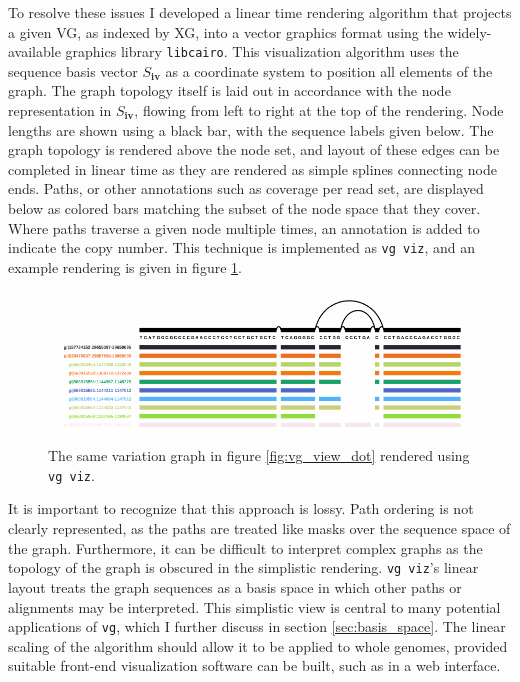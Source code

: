 To resolve these issues I developed a linear time rendering algorithm that projects a given VG, as indexed by XG, into a vector graphics format using the widely-available graphics library {\tt libcairo}.
This visualization algorithm uses the sequence basis vector $S_\textbf{iv}$ as a coordinate system to position all elements of the graph.
The graph topology itself is laid out in accordance with the node representation in $S_\textbf{iv}$, flowing from left to right at the top of the rendering.
Node lengths are shown using a black bar, with the sequence labels given below.
The graph topology is rendered above the node set, and layout of these edges can be completed in linear time as they are rendered as simple splines connecting node ends.
Paths, or other annotations such as coverage per read set, are displayed below as colored bars matching the subset of the node space that they cover.
Where paths traverse a given node multiple times, an annotation is added to indicate the copy number.
This technique is implemented as {\tt vg viz}, and an example rendering is given in figure \ref{fig:vg_viz}.

\begin{figure}[htbp!] 
\centering    
\includegraphics[width=1.0\textwidth]{Chapter2/Figs/vg_viz_H-3136.pdf}
\caption[Linearized variation graph visualization]{The same variation graph in figure \ref{fig:vg_view_dot} rendered using {\tt vg viz}.}
\label{fig:vg_viz}
\end{figure}

It is important to recognize that this approach is lossy.
Path ordering is not clearly represented, as the paths are treated like masks over the sequence space of the graph.
Furthermore, it can be difficult to interpret complex graphs as the topology of the graph is obscured in the simplistic rendering.
{\tt vg viz}'s linear layout treats the graph sequences as a basis space in which other paths or alignments may be interpreted.
This simplistic view is central to many potential applications of {\tt vg}, which I further discuss in section \ref{sec:basis_space}.
The linear scaling of the algorithm should allow it to be applied to whole genomes, provided suitable front-end visualization software can be built, such as in a web interface.

